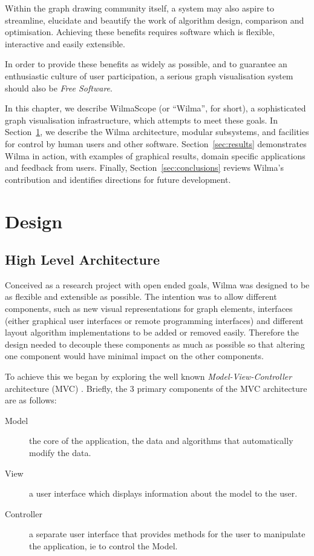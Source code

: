 \documentclass[runningheads]{cl2emult}
\begin{document}
Within the graph drawing community itself, a system may also aspire to 
streamline, elucidate and beautify the work of algorithm design, comparison
and optimisation.  Achieving these benefits requires software which is
flexible, interactive and easily extensible.

In order to provide these benefits as widely as possible, and to guarantee
an enthusiastic culture of user participation, a serious graph visualisation
system should also be {\em Free Software}\cite{stallman92why}.

In this chapter, we describe WilmaScope (or ``Wilma'', for short), a
sophisticated graph visualisation infrastructure, which attempts to meet
these goals.  In Section~\ref{sec:design}, we describe the Wilma
architecture, modular subsystems, and facilities for control by human users
and other software.  Section~\ref{sec:results} demonstrates Wilma in
action, with examples of graphical results, domain specific applications and
feedback from users.  Finally, Section~\ref{sec:conclusions} reviews Wilma's
contribution and identifies directions for future development.

\section{Design}\label{sec:design}
\subsection{High Level Architecture}
Conceived as a research project with open ended goals, Wilma was
designed to be as flexible and extensible as possible.  The intention
was to allow different components, such as new visual representations
for graph elements, interfaces (either graphical user interfaces or
remote programming interfaces) and different 
layout algorithm implementations to be added or removed easily.
Therefore the design needed to decouple these components as much as
possible so that altering one component would have minimal impact on
the other components.

To achieve this we began by exploring the well known {\em
Model-View-Controller} architecture (MVC) \cite{gamma94design}.
Briefly, the 3 primary components of the MVC architecture are as
follows: 

\begin{description}
\item[Model] the core
of the application, the data and algorithms that automatically modify
the data. 
\item[View] a user interface which displays information
about the model to the user. 
\item[Controller] a separate user
interface that provides methods for the user to manipulate the
application, ie to control the Model.  
\end{description}
\end{document}
